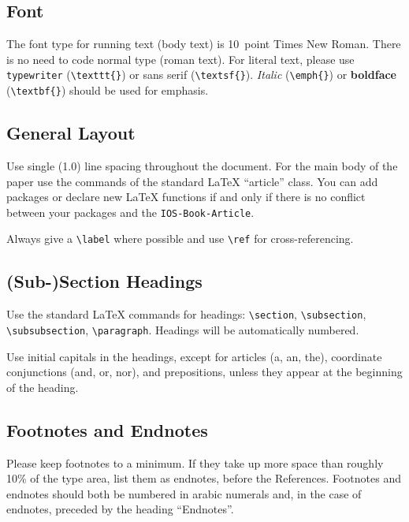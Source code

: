 \documentclass{IOS-Book-Article}
\begin{document}
\subsection{Font}

The font type for running text (body text) is 10~point Times New Roman.
There is no need to code normal type (roman text). For literal text, please use
\texttt{type\-writer} (\verb|\texttt{}|)
or \textsf{sans serif} (\verb|\textsf{}|). \emph{Italic} (\verb|\emph{}|)
or \textbf{boldface} (\verb|\textbf{}|) should be used for emphasis.

\subsection{General Layout}
Use single (1.0) line spacing throughout the document. For the main
body of the paper use the commands of the standard \LaTeX{}
``article'' class. You can add packages or declare new \LaTeX{}
functions if and only if there is no conflict between your packages
and the \texttt{IOS-Book-Article}.

Always give a \verb|\label| where possible and use \verb|\ref| for cross-referencing.


\subsection{(Sub-)Section Headings}
Use the standard \LaTeX{} commands for headings: {\small \verb|\section|, \verb|\subsection|, \verb|\subsubsection|, \verb|\paragraph|}.
Headings will be automatically numbered.

Use initial capitals in the headings, except for articles (a, an, the), coordinate
conjunctions (and, or, nor), and prepositions, unless they appear at the beginning
of the heading.

\subsection{Footnotes and Endnotes}
Please keep footnotes to a minimum. If they take up more space than roughly 10\% of
the type area, list them as endnotes, before the References. Footnotes and endnotes
should both be numbered in arabic numerals and, in the case of endnotes, preceded by
the heading ``Endnotes''.
\end{document}
